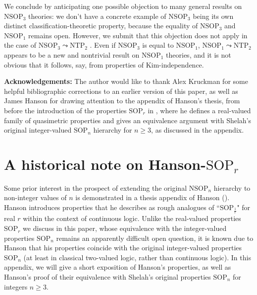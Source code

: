 \documentclass{amsart}
\theoremstyle{definition}
\theoremstyle{remark}
\numberwithin{equation}{section}
\begin{document}
\begin{tcolorbox}
\: We conclude by anticipating one possible objection to many general results on $\mathrm{NSOP}_{3}$ theories: we don't have a concrete example of $\mathrm{NSOP}_{3}$ being its own distinct classification-theoretic property, because the equality of $\mathrm{NSOP}_{3}$ and $\mathrm{NSOP}_{1}$ remains open. However, we submit that this objection does not apply in the case of $\mathrm{NSOP}_{3} \leadsto \mathrm{NTP}_{2}$ . Even if $\mathrm{NSOP}_{3}$ is equal to $\mathrm{NSOP}_{1}$, $\mathrm{NSOP}_{1} \leadsto \mathrm{NTP}_{2}$ appears to be a new and nontrivial result on $\mathrm{NSOP}_{1}$ theories, and it is not obvious that it follows, say, from properties of Kim-independence.






   
\end{tcolorbox}

\textbf{Acknowledgements:} The author would like to thank Alex Kruckman for some helpful bibliographic corrections to an earlier version of this paper, as well as James Hanson for drawing attention to the appendix of Hanson's thesis, from before the introduction of the properties $\mathrm{SOP}_{r}$ in \cite{ApproxOrder}, where he defines a real-valued family of quasimetric properties and gives an equivalence argument with Shelah's original integer-valued $\mathrm{SOP}_{n}$ hierarchy for $n \geq 3$, as discussed in the appendix.

\appendix

\section{A historical note on Hanson-$\mathrm{SOP}_{r}$}

Some prior interest in the prospect of extending the original $\mathrm{NSOP}_{n}$ hierarchy to non-integer values of $n$ is demonstrated in a thesis appendix of Hanson (\cite{Hanson2020}). Hanson introduces properties that he describes as rough analogues of ``$\mathrm{SOP}_{\frac{1}{r}}$" for real $r$ within the context of continuous logic. Unlike the real-valued properties $\mathrm{SOP}_{r}$ we discuss in this paper, whose equivalence with the integer-valued properties $\mathrm{SOP}_{n}$ remains an apparently difficult open question, it is known due to Hanson that his properties coincide with the original integer-valued properties $\mathrm{SOP}_{n}$ (at least in classical two-valued logic, rather than continuous logic). In this appendix, we will give a short exposition of Hanson's properties, as well as Hanson's proof of their equivalence with Shelah's original properties $\mathrm{SOP}_{n}$ for integers $n \geq 3$.
\end{document}
